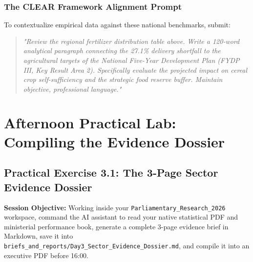 \documentclass[11pt, a4paper]{report}
\begin{document}
\subsection{The CLEAR Framework Alignment Prompt}
To contextualize empirical data against these national benchmarks, submit:
\begin{quote}
\small
\textit{"Review the regional fertilizer distribution table above. Write a 120-word analytical paragraph connecting the 27.1\% delivery shortfall to the agricultural targets of the National Five-Year Development Plan (FYDP III, Key Result Area 2). Specifically evaluate the projected impact on cereal crop self-sufficiency and the strategic food reserve buffer. Maintain objective, professional language."}
\end{quote}

\vspace{1.5em}
\noindent{}
\vspace{1.5em}

\newpage

\chapter{Afternoon Practical Lab: Compiling the Evidence Dossier}

\section{Practical Exercise 3.1: The 3-Page Sector Evidence Dossier}
\textbf{Session Objective:} Working inside your \texttt{Parliamentary\_Research\_2026} workspace, command the AI assistant to read your native statistical PDF and ministerial performance book, generate a complete 3-page evidence brief in Markdown, save it into \texttt{briefs\_and\_reports/Day3\_Sector\_Evidence\_Dossier.md}, and compile it into an executive PDF before 16:00.
\end{document}
